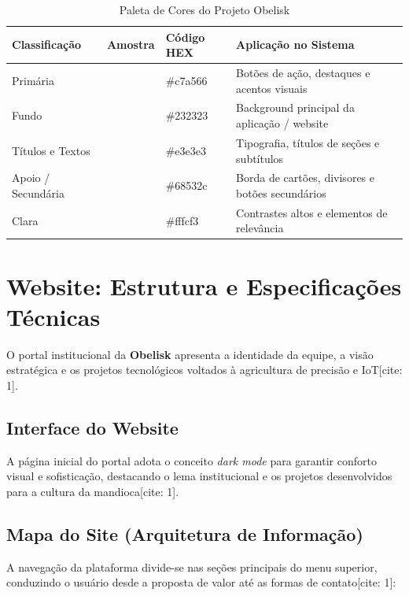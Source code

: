 \documentclass[11pt,a4paper]{article}
\begin{document}
\begin{table}[H]
\centering
\caption{Paleta de Cores do Projeto Obelisk}
\label{tab:cores}
\begin{tabular}{|l|c|l|l|}
\hline
\textbf{Classificação} & \textbf{Amostra} & \textbf{Código HEX} & \textbf{Aplicação no Sistema} \\
\hline
Primária & \colorbox{colorPrimaria}{\phantom{AAA}} & \#c7a566 & Botões de ação, destaques e acentos visuais \\
Fundo & \colorbox{colorFundo}{\phantom{AAA}} & \#232323 & Background principal da aplicação / website \\
Títulos e Textos & \colorbox{colorTexto}{\phantom{AAA}} & \#e3e3e3 & Tipografia, títulos de seções e subtítulos \\
Apoio / Secundária & \colorbox{colorSecundaria}{\phantom{AAA}} & \#68532c & Borda de cartões, divisores e botões secundários \\
Clara & \colorbox{colorClara}{\phantom{AAA}} & \#fffcf3 & Contrastes altos e elementos de relevância \\
\hline
\end{tabular}
\end{table}

\section{Website: Estrutura e Especificações Técnicas}

O portal institucional da \textbf{Obelisk} apresenta a identidade da equipe, a visão estratégica e os projetos tecnológicos voltados à agricultura de precisão e IoT[cite: 1].

\subsection{Interface do Website}

A página inicial do portal adota o conceito \textit{dark mode} para garantir conforto visual e sofisticação, destacando o lema institucional e os projetos desenvolvidos para a cultura da mandioca[cite: 1].

\subsection{Mapa do Site (Arquitetura de Informação)}

A navegação da plataforma divide-se nas seções principais do menu superior, conduzindo o usuário desde a proposta de valor até as formas de contato[cite: 1]:
\end{document}

